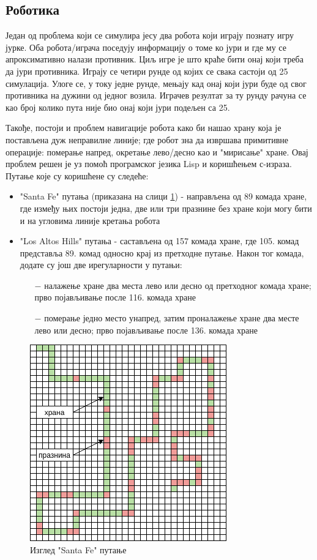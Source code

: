 \documentclass[a4paper]{article}
\begin{document}
\subsection{Роботика}
Један од проблема који се симулира јесу два робота који играју познату игру јурке. Оба робота/играча поседују информацију о томе ко јури и где му се апроксимативно налази противник. Циљ игре је што краће бити онај који треба да јури противника. Играју се четири рунде од којих се свака састоји од 25 симулација. Улоге се, у току једне рунде, мењају кад онај који јури буде од свог противника на дужини од једног возила. Играчев резултат за ту рунду рачуна се као број колико пута није био онај који јури подељен са 25. \cite{robo1}

Такође, постоји и проблем навигације робота како би нашао храну која је постављена дуж неправилне линије; где робот зна да извршава примитивне операције: померање напред, окретање лево/десно као и "мирисање" хране.
Овај проблем решен је уз помоћ програмског језика Lisp и коришћењем с-израза. \cite{lisp} Путање које су коришћене су следеће:
\begin{itemize}
	\item "Santa Fe" путања (приказана на слици \ref{fig:santa_fe}) - направљена од 89 комада хране, где између њих постоји једна, две или три празнине без хране који могу бити и на угловима линије кретања робота
	\item "Los Altos Hills" путања - састављена од 157 комада хране, где 105. комад представља 89. комад односно крај из претходне путање. Након тог комада, додате су још две ирегуларности у путањи:
	\begin{itemize}
		\item[$-$] налажење хране два места лево или десно од претходног комада хране; прво појављивање после 116. комада хране 
		\item[$-$] померање једно место унапред, затим проналажење хране два месте лево или десно; прво појављивање после 136. комада хране
	\end{itemize}
\end{itemize}

\begin{figure}[h!]
    \begin{center}
        \includegraphics[scale=0.55]{santa_fe.png}
    \end{center}
    \caption{Изглед "Santa Fe" путање}
    \label{fig:santa_fe}
\end{figure}
\end{document}
